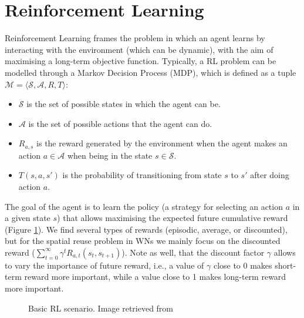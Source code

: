 \documentclass[12pt, a4paper,twoside]{tesi_upf}
\begin{document}
		
		\section{Reinforcement Learning}
		\label{section:rl}				
			Reinforcement Learning frames the problem in which an agent learns by interacting with the environment (which can be dynamic), with the aim of maximising a long-term objective function. Typically, a RL problem can be modelled through a Markov Decision Process (MDP), which is defined as a tuple $\mathcal{M} = \langle \mathcal{S}, \mathcal{A}, R, T\rangle$:
			\begin{itemize}
				\item $\mathcal{S}$ is the set of possible states in which the agent can be.
				\item $\mathcal{A}$ is the set of possible actions that the agent can do.
				\item $R_{a,s}$ is the reward generated by the environment  when the agent makes an action $a \in \mathcal{A}$ when being in the state $s \in \mathcal{S}$.
				\item $T(s,a,s')$ is the probability of transitioning from state $s$ to $s'$ after doing action $a$.
			\end{itemize}
			The goal of the agent is to learn the policy (a strategy for selecting an action $a$ in a given state $s$) that allows maximising the expected future cumulative reward (Figure \ref{fig:rl_scenario}). We find several types of rewards (episodic, average, or discounted), but for the spatial reuse problem in WNs we mainly focus on the discounted reward ($\sum_{t=0}^{\infty} \gamma^t R_{a,t}(s_t,s_{t+1})$). Note as well, that the discount factor $\gamma$ allows to vary the importance of future reward, i.e., a value of $\gamma$ close to 0 makes short-term reward more important, while a value close to 1 makes long-term reward more important.			
			\begin{figure}[h!]
				\centering
				\caption{Basic RL scenario. Image retrieved from \cite{sutton1998reinforcement}}
				\label{fig:rl_scenario}
			\end{figure}		
			
\end{document}
